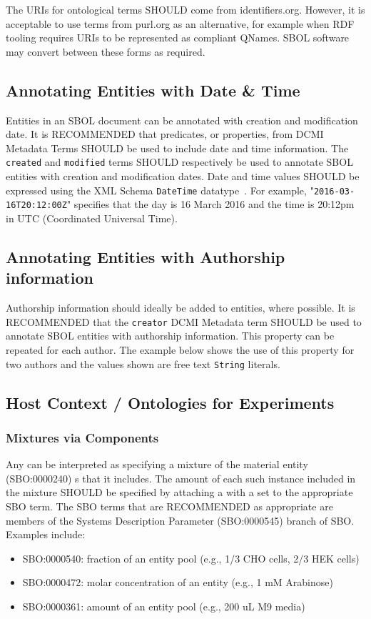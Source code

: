 The URIs for ontological terms SHOULD come from identifiers.org.  However, it is acceptable to use terms from purl.org as an alternative, for example when RDF tooling requires URIs to be represented as compliant QNames.  SBOL software may convert between these forms as required.

\subsection{Annotating Entities with Date \& Time}\label{sec:DateTime}
Entities in an SBOL document can be annotated with creation and modification date. It is RECOMMENDED that predicates, or properties, from DCMI Metadata Terms SHOULD be used to include date and time information. The \texttt{created} and \texttt{modified} terms SHOULD respectively be used to annotate SBOL entities with creation and modification dates. Date and time values SHOULD be expressed using the XML Schema \texttt{DateTime} datatype~\citep{Biron2004}. For example, "\texttt{2016-03-16T20:12:00Z}" specifies that the day is 16 March 2016 and the time is 20:12pm in UTC (Coordinated Universal Time).

\subsection{Annotating Entities with Authorship information}\label{sec:Authorship}
Authorship information should ideally be added to  entities, where possible. It is RECOMMENDED that the \texttt{creator} DCMI Metadata term SHOULD be used to annotate SBOL entities with authorship information. This property can be repeated for each author. The example below shows the use of this property for two authors and the values shown are free text \texttt{String} literals.

\subsection{Host Context / Ontologies for Experiments}

\subsubsection{Mixtures via Components}

Any  can be interpreted as specifying a mixture of the material entity (SBO:0000240) s that it includes.  The amount of each such instance included in the mixture SHOULD be specified by attaching a  with a  set to the appropriate SBO term. The SBO terms that are RECOMMENDED as appropriate are members of the Systems Description Parameter (SBO:0000545) branch of SBO. Examples include:
\begin{itemize}
\item SBO:0000540: fraction of an entity pool (e.g., 1/3 CHO cells, 2/3 HEK cells)
\item SBO:0000472: molar concentration of an entity (e.g., 1 mM Arabinose)
\item SBO:0000361: amount of an entity pool (e.g., 200 uL M9 media)
\end{itemize}


